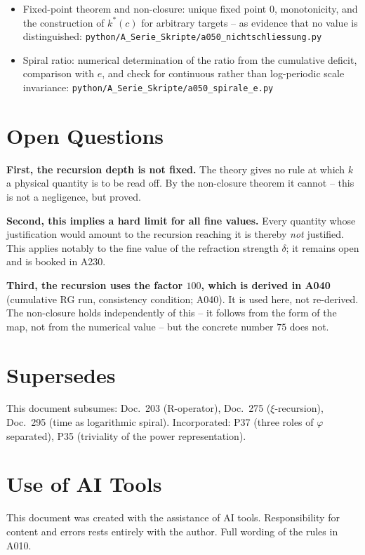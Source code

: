 \begin{itemize}
  \item Fixed-point theorem and non-closure: unique fixed point $0$, monotonicity,
    and the construction of $k^*(c)$ for arbitrary targets -- as evidence that
    no value is distinguished:
    \texttt{python/A\_Serie\_Skripte/a050\_nichtschliessung.py}
  \item Spiral ratio: numerical determination of the ratio from the cumulative
    deficit, comparison with $e$, and check for continuous rather than
    log-periodic scale invariance:
    \texttt{python/A\_Serie\_Skripte/a050\_spirale\_e.py}
\end{itemize}

\section{Open Questions}

\textbf{First, the recursion depth is not fixed.} The theory gives no rule
at which $k$ a physical quantity is to be read off. By the non-closure theorem
it cannot -- this is not a negligence, but proved.

\textbf{Second, this implies a hard limit for all fine values.} Every quantity
whose justification would amount to the recursion reaching it is thereby
\emph{not} justified. This applies notably to the fine value of the refraction
strength $\delta$; it remains open and is booked in A230.

\textbf{Third, the recursion uses the factor $100$, which is derived in A040}
(cumulative RG run, consistency condition; A040). It is used here, not
re-derived. The non-closure holds independently of this -- it follows from
the form of the map, not from the numerical value -- but the concrete number
$75$ does not.

\section{Supersedes}

This document subsumes: Doc.~203 (R-operator), Doc.~275 ($\xi$-recursion),
Doc.~295 (time as logarithmic spiral). Incorporated: P37 (three roles of
$\varphi$ separated), P35 (triviality of the power representation).

\section{Use of AI Tools}

This document was created with the assistance of AI tools.
Responsibility for content and errors rests entirely with the author.
Full wording of the rules in A010.
